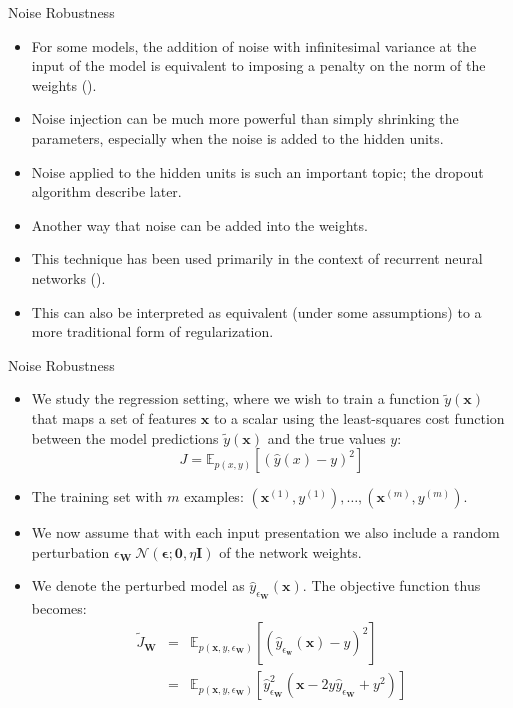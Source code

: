 \documentclass[10pt]{beamer}
\begin{document}
	\begin{frame}{Noise Robustness}
		\begin{itemize}
			\item For some models, the addition of noise with infinitesimal variance at the input of the model is equivalent to imposing a penalty on the norm of the weights (\citet{bishop1995regularization,bishop1995training}).
			\pause
			\item Noise injection can be much more powerful than simply shrinking the parameters, especially when the noise is added to the hidden units.
			\pause
			\item Noise applied to the hidden units is such an important topic; the dropout algorithm describe later.
			\pause
			\item Another way that noise can be added into the weights.
			\pause
			\item This technique has been used primarily in the context of recurrent neural networks (\citet{jim1996analysis,graves2011practical}).
			\pause
			\item This can also be interpreted as equivalent (under some assumptions) to a more traditional form of regularization.
		\end{itemize}
	\end{frame}

	\begin{frame}{Noise Robustness}
		\begin{itemize}
			\item We study the regression setting, where we wish to train a function $\tilde{y}(\bm{x})$ that maps a set of features $\bm{x}$ to a scalar using the least-squares cost function between the model predictions $\tilde{y}(\bm{x})$ and the true values $y$:
			$$J=\mathbb{E}_{p(x,y)}\left[(\hat{y}(x)-y)^2\right]$$
			
			\pause
			\item The training set with $m$ examples: ${(\bm{x}^{(1)},y^{(1)}),\dots,(\bm{x}^{(m)},y^{(m)})}$.
			\pause
			\item We now assume that with each input presentation we also include a random perturbation $\epsilon_{\bm{W}}~\mathcal{N}(\bm{\epsilon};\bm{0},\eta\bm{I})$ of the network weights.
			\pause
			\item We denote the perturbed model as $\hat{y}_{\epsilon_{\bm{W}}}(\bm{x})$. The objective function thus becomes:
			\begin{eqnarray*}
				\tilde{J}_{\bm{W}}&=&\mathbb{E}_{p(\bm{x},y,\epsilon_{\bm{W}})}\left[(\hat{y}_{\epsilon_{\bm{w}}}(\bm{x})-y)^2\right]\\
				&=&\mathbb{E}_{p(\bm{x},y,\epsilon_{\bm{W}})}\left[\hat{y}^2_{\epsilon_{\bm{W}}}(\bm{x}-2y\hat{y}_{\epsilon_{\bm{W}}}+y^2)\right]
			\end{eqnarray*}
			\pause
		\end{itemize}
	\end{frame}
\end{document}
